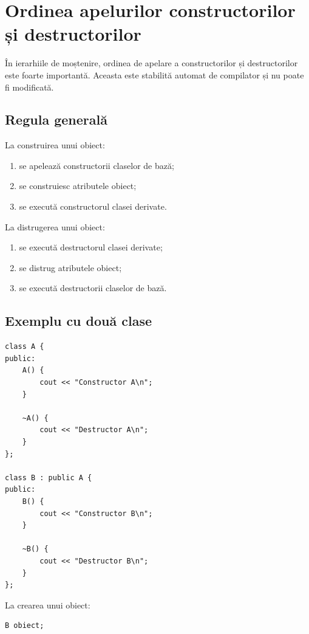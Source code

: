 \documentclass[12pt,a4paper]{article}
\begin{document}
\section{Ordinea apelurilor constructorilor și destructorilor}

În ierarhiile de moștenire, ordinea de apelare a constructorilor și destructorilor este foarte importantă. Aceasta este stabilită automat de compilator și nu poate fi modificată.

\subsection{Regula generală}

La construirea unui obiect:

\begin{enumerate}
\item se apelează constructorii claselor de bază;
\item se construiesc atributele obiect;
\item se execută constructorul clasei derivate.
\end{enumerate}

La distrugerea unui obiect:

\begin{enumerate}
\item se execută destructorul clasei derivate;
\item se distrug atributele obiect;
\item se execută destructorii claselor de bază.
\end{enumerate}

\subsection{Exemplu cu două clase}

\begin{verbatim}
class A {
public:
    A() {
        cout << "Constructor A\n";
    }

    ~A() {
        cout << "Destructor A\n";
    }
};

class B : public A {
public:
    B() {
        cout << "Constructor B\n";
    }

    ~B() {
        cout << "Destructor B\n";
    }
};
\end{verbatim}

La crearea unui obiect:

\begin{verbatim}
B obiect;
\end{verbatim}
\end{document}

